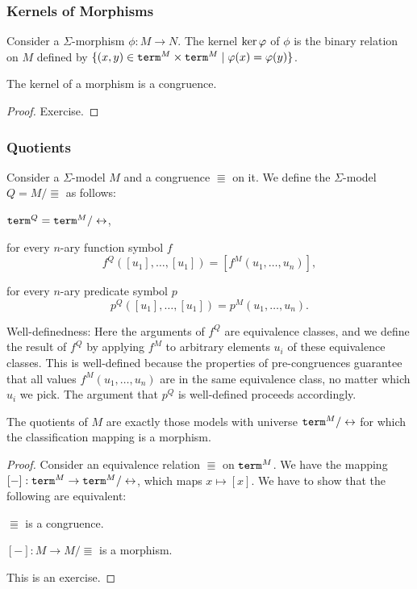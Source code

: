 \subsubsection{Kernels of Morphisms}

\begin{definition}[Kernels]
Consider a $\Sigma$-morphism $\phi:M\to N$.
The kernel $\mathrm{ker}\, \varphi$ of $\phi$ is the binary relation on $M$ defined by $\{(x,y)\in \mathtt{term}^M\times \mathtt{term}^M\;|\;\varphi(x)=\varphi(y)\}$.
\end{definition}

\begin{theorem}
The kernel of a morphism is a congruence.
\end{theorem}
\begin{proof}
Exercise.
\end{proof}

\subsubsection{Quotients}

\begin{definition}
Consider a $\Sigma$-model $M$ and a congruence $\Equiv$ on it.
We define the $\Sigma$-model $Q=M/\Equiv$ as follows:
\begin{compactitem}
\item $\univ^{Q}=\univ^{M}/\Equiv$,
\item for every $n$-ary function symbol $f$
 \[f^{Q}([u_1],\ldots,[u_1])=[f^{M}(u_1,\ldots,u_n)],\]
\item for every $n$-ary predicate symbol $p$
 \[p^{Q}([u_1],\ldots,[u_1])=p^{M}(u_1,\ldots,u_n).\]
\end{compactitem}

Well-definedness:
Here the arguments of $f^Q$ are equivalence classes, and we define the result of $f^Q$ by applying $f^M$ to arbitrary elements $u_i$ of these equivalence classes.
This is well-defined because the properties of pre-congruences guarantee that all values $f^M(u_1,\ldots,u_n)$ are in the same equivalence class, no matter which $u_i$ we pick.
The argument that $p^Q$ is well-defined proceeds accordingly.
\end{definition}

\begin{theorem}
The quotients of $M$ are exactly those models with universe $\univ^M/\Equiv$ for which the classification mapping is a morphism.
\end{theorem}
\begin{proof}
Consider an equivalence relation $\Equiv$ on $\mathtt{term}^M$.
We have the mapping $[-]:\univ^M\to \univ^M/\Equiv$, which maps $x\mapsto [x]$.
We have to show that the following are equivalent:
\begin{compactenum}
 \item $\Equiv$ is a congruence.
 \item $[-]:M\to M/\Equiv$ is a morphism.
\end{compactenum}
This is an exercise.
\end{proof}

